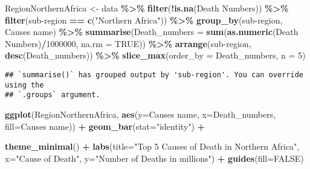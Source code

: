 \documentclass[
]{article}
\newenvironment{Shaded}{\begin{snugshade}}{\end{snugshade}}
\newcommand{\AttributeTok}[1]{\textcolor[rgb]{0.13,0.29,0.53}{#1}}
\newcommand{\ConstantTok}[1]{\textcolor[rgb]{0.56,0.35,0.01}{#1}}
\newcommand{\DecValTok}[1]{\textcolor[rgb]{0.00,0.00,0.81}{#1}}
\newcommand{\FunctionTok}[1]{\textcolor[rgb]{0.13,0.29,0.53}{\textbf{#1}}}
\newcommand{\NormalTok}[1]{#1}
\newcommand{\OtherTok}[1]{\textcolor[rgb]{0.56,0.35,0.01}{#1}}
\newcommand{\SpecialCharTok}[1]{\textcolor[rgb]{0.81,0.36,0.00}{\textbf{#1}}}
\newcommand{\StringTok}[1]{\textcolor[rgb]{0.31,0.60,0.02}{#1}}
\begin{document}
\begin{Shaded}
\begin{Highlighting}[]
\NormalTok{RegionNorthernAfrica }\OtherTok{\textless{}{-}}\NormalTok{ data }\SpecialCharTok{\%\textgreater{}\%}
  \FunctionTok{filter}\NormalTok{(}\SpecialCharTok{!}\FunctionTok{is.na}\NormalTok{(}\StringTok{\textasciigrave{}}\AttributeTok{Death Numbers}\StringTok{\textasciigrave{}}\NormalTok{)) }\SpecialCharTok{\%\textgreater{}\%}
  \FunctionTok{filter}\NormalTok{(}\StringTok{\textasciigrave{}}\AttributeTok{sub{-}region}\StringTok{\textasciigrave{}} \SpecialCharTok{==} \FunctionTok{c}\NormalTok{(}\StringTok{"Northern Africa"}\NormalTok{)) }\SpecialCharTok{\%\textgreater{}\%}
  \FunctionTok{group\_by}\NormalTok{(}\StringTok{\textasciigrave{}}\AttributeTok{sub{-}region}\StringTok{\textasciigrave{}}\NormalTok{, }\StringTok{\textasciigrave{}}\AttributeTok{Causes name}\StringTok{\textasciigrave{}}\NormalTok{) }\SpecialCharTok{\%\textgreater{}\%}
  \FunctionTok{summarise}\NormalTok{(}\AttributeTok{Death\_numbers =} \FunctionTok{sum}\NormalTok{(}\FunctionTok{as.numeric}\NormalTok{(}\StringTok{\textasciigrave{}}\AttributeTok{Death Numbers}\StringTok{\textasciigrave{}}\NormalTok{)}\SpecialCharTok{/}\DecValTok{1000000}\NormalTok{, }\AttributeTok{na.rm =} \ConstantTok{TRUE}\NormalTok{)) }\SpecialCharTok{\%\textgreater{}\%}
  \FunctionTok{arrange}\NormalTok{(}\StringTok{\textasciigrave{}}\AttributeTok{sub{-}region}\StringTok{\textasciigrave{}}\NormalTok{, }\FunctionTok{desc}\NormalTok{(Death\_numbers)) }\SpecialCharTok{\%\textgreater{}\%}
  \FunctionTok{slice\_max}\NormalTok{(}\AttributeTok{order\_by =}\NormalTok{ Death\_numbers, }\AttributeTok{n =} \DecValTok{5}\NormalTok{)}
\end{Highlighting}
\end{Shaded}

\begin{verbatim}
## `summarise()` has grouped output by 'sub-region'. You can override using the
## `.groups` argument.
\end{verbatim}

\begin{Shaded}
\begin{Highlighting}[]
\FunctionTok{ggplot}\NormalTok{(RegionNorthernAfrica, }\FunctionTok{aes}\NormalTok{(}\AttributeTok{y=}\StringTok{\textasciigrave{}}\AttributeTok{Causes name}\StringTok{\textasciigrave{}}\NormalTok{, }\AttributeTok{x=}\NormalTok{Death\_numbers, }\AttributeTok{fill=}\StringTok{\textasciigrave{}}\AttributeTok{Causes name}\StringTok{\textasciigrave{}}\NormalTok{)) }\SpecialCharTok{+}
  \FunctionTok{geom\_bar}\NormalTok{(}\AttributeTok{stat=}\StringTok{"identity"}\NormalTok{) }\SpecialCharTok{+}
 
  \FunctionTok{theme\_minimal}\NormalTok{() }\SpecialCharTok{+} 
  \FunctionTok{labs}\NormalTok{(}\AttributeTok{title=}\StringTok{"Top 5 Causes of Death in Northern Africa"}\NormalTok{,}
       \AttributeTok{x=}\StringTok{"Cause of Death"}\NormalTok{,}
       \AttributeTok{y=}\StringTok{"Number of Deaths in millions"}\NormalTok{) }\SpecialCharTok{+}
  \FunctionTok{guides}\NormalTok{(}\AttributeTok{fill=}\ConstantTok{FALSE}\NormalTok{)}
\end{Highlighting}
\end{Shaded}
\end{document}
